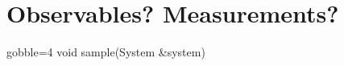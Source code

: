 


\section{Observables? Measurements?}
% 
% 
%
%
%
\begin{listing}[!htb]%
\begin{cppcode*}{gobble=4}
    void sample(System &system)
    {
    }
\end{cppcode*}
\caption{%
    \hl{FINISH THIS LISTING}. Implementation of the function \texttt{sample} from \cref{list:simple_md_program}.%
    \label{list:sampling}%
}%
\end{listing}%


